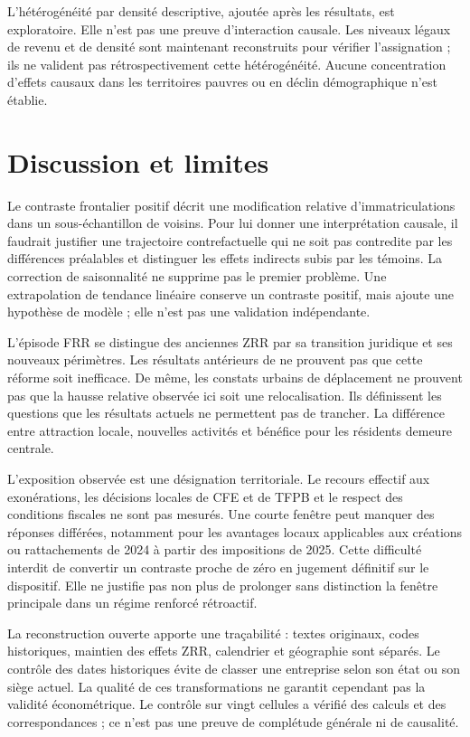 L’hétérogénéité par densité descriptive, ajoutée après les résultats, est exploratoire. Elle n’est pas une preuve d’interaction causale. Les niveaux légaux de revenu et de densité sont maintenant reconstruits pour vérifier l’assignation ; ils ne valident pas rétrospectivement cette hétérogénéité. Aucune concentration d’effets causaux dans les territoires pauvres ou en déclin démographique n’est établie.

\section{Discussion et limites}
Le contraste frontalier positif décrit une modification relative d’immatriculations dans un sous-échantillon de voisins. Pour lui donner une interprétation causale, il faudrait justifier une trajectoire contrefactuelle qui ne soit pas contredite par les différences préalables et distinguer les effets indirects subis par les témoins. La correction de saisonnalité ne supprime pas le premier problème. Une extrapolation de tendance linéaire conserve un contraste positif, mais ajoute une hypothèse de modèle ; elle n’est pas une validation indépendante.

L’épisode FRR se distingue des anciennes ZRR par sa transition juridique et ses nouveaux périmètres. Les résultats antérieurs de \citet{ref1} ne prouvent pas que cette réforme soit inefficace. De même, les constats urbains de déplacement \citep{ref2,ref4} ne prouvent pas que la hausse relative observée ici soit une relocalisation. Ils définissent les questions que les résultats actuels ne permettent pas de trancher. La différence entre attraction locale, nouvelles activités et bénéfice pour les résidents demeure centrale.

L’exposition observée est une désignation territoriale. Le recours effectif aux exonérations, les décisions locales de CFE et de TFPB et le respect des conditions fiscales ne sont pas mesurés. Une courte fenêtre peut manquer des réponses différées, notamment pour les avantages locaux applicables aux créations ou rattachements de 2024 à partir des impositions de 2025. Cette difficulté interdit de convertir un contraste proche de zéro en jugement définitif sur le dispositif. Elle ne justifie pas non plus de prolonger sans distinction la fenêtre principale dans un régime renforcé rétroactif.

La reconstruction ouverte apporte une traçabilité : textes originaux, codes historiques, maintien des effets ZRR, calendrier et géographie sont séparés. Le contrôle des dates historiques évite de classer une entreprise selon son état ou son siège actuel. La qualité de ces transformations ne garantit cependant pas la validité économétrique. Le contrôle sur vingt cellules a vérifié des calculs et des correspondances ; ce n’est pas une preuve de complétude générale ni de causalité.

